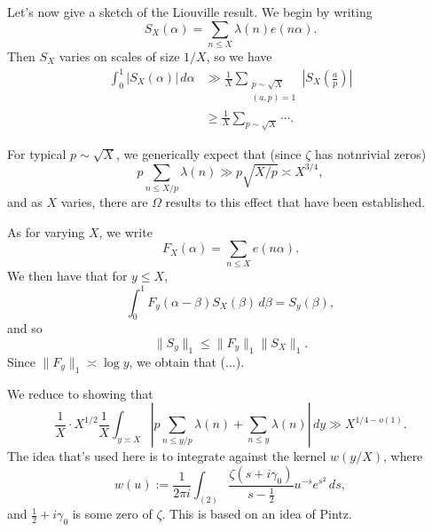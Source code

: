 \documentclass[reqno]{amsart} 
\begin{document}
Let's now give a sketch of the Liouville result.  We begin by writing
\begin{equation*}
S_X (\alpha) = \sum_{n \leq X } \lambda (n ) e (n \alpha ).
\end{equation*}
Then $S_X$ varies on scales of size $1/X$, so we have
\begin{align*}
  \int_0^1  \lvert S_X (\alpha)  \rvert \, d \alpha
  &\gg \frac{1}{X}
    \sum_{
    \substack{
    p \sim \sqrt{X}  \\
   (a, p ) = 1
  }
  }
  \left\lvert S_X \left( \frac{a}{p} \right) \right\rvert
  \\
  &\geq
    \frac{1}{X}
    \sum_{p \sim \sqrt{X}}
    \dotsb.
\end{align*}

For typical $p \sim \sqrt{X}$, we generically expect that (since $\zeta$ has notnrivial zeros)
\begin{equation*}
p \sum_{n \leq X /p } \lambda (n ) \gg p \sqrt{X / p } \asymp X^{3/4},
\end{equation*}
and as $X$ varies, there are $\Omega$ results to this effect that have been established.

As for varying $X$, we write
\begin{equation*}
F_X (\alpha) = \sum_{n \leq X} e (n \alpha ).
\end{equation*}
We then have that for $y \leq X$,
\begin{equation*}
\int_0^1 F_y (\alpha - \beta ) S_X (\beta) \, d \beta = S_y (\beta),
\end{equation*}
and so
\begin{equation*}
\lVert S_y \rVert_1 \leq \lVert F_y  \rVert_1 \lVert S_X  \rVert_1.
\end{equation*}
Since $\lVert F_y  \rVert_1 \asymp \log y$, we obtain that (...).

We reduce to showing that
\begin{equation*}
  \frac{1}{X} \cdot X^{1/2} \frac{1}{X} \int_{y \asymp X} \left\lvert p \sum_{n \leq y / p } \lambda (n )
  + \sum_{n \leq y} \lambda (n)\right\rvert \, d y \gg X^{1/4 - o(1)}.
\end{equation*}
The idea that's used here is to integrate against the kernel $w(y/X)$, where
\begin{equation*}
  w (u) := \frac{1}{2 \pi i } \int_{(2)} \frac{\zeta (s + i \gamma_0 )}{ s - \tfrac{1}{2} }
  u^{- s} e^{s^2 } \, d s,
\end{equation*}
and $\frac{1}{2} + i \gamma_0 $ is some zero of $\zeta$.  This is based on an idea of Pintz.
\end{document}
